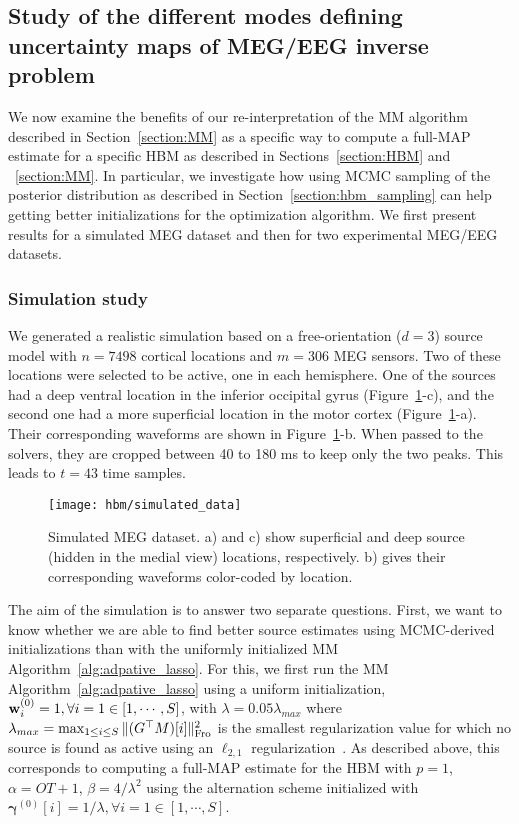 \subsection{Study of the different modes defining uncertainty maps of MEG/EEG inverse problem}

We now examine the benefits of our re-interpretation of the MM algorithm described in Section~\ref{section:MM} as a specific way to compute a full-MAP estimate for a specific HBM as described in Sections~\ref{section:HBM} and ~\ref{section:MM}.
In particular, we investigate how using MCMC sampling of the posterior distribution as described in Section~\ref{section:hbm_sampling} can help getting better initializations for the optimization algorithm.
We first present results for a simulated MEG dataset and then for two experimental MEG/EEG datasets.

\subsubsection{Simulation study}
We generated a realistic simulation based on a free-orientation ($d=3$) source model with $n=7498$ cortical locations and $m=306$ MEG sensors. Two of these locations were selected to be active, one in each hemisphere. One of the sources had a deep ventral location in the inferior occipital gyrus (Figure~\ref{fig:simulated_data}-c), and the second one had a more superficial location in the motor cortex (Figure~\ref{fig:simulated_data}-a). Their corresponding waveforms are shown in Figure~\ref{fig:simulated_data}-b. When passed to the solvers, they are cropped between 40 to 180 ms to keep only the two peaks. This leads to $t=43$ time samples.

\begin{figure}[htp]
	\centering
	\texttt{[image: hbm/simulated\_data]}%

	\caption{Simulated MEG dataset. a) and c) show superficial and deep source (hidden in the medial view) locations, respectively. b) gives their corresponding waveforms color-coded by location.}
	\label{fig:simulated_data}
\end{figure}

The aim of the simulation is to answer two separate questions. First, we want to know whether we are able to find better source estimates using MCMC-derived initializations than with the uniformly initialized MM Algorithm~\ref{alg:adpative_lasso}.
For this, we first run the MM Algorithm~\ref{alg:adpative_lasso} using a uniform initialization, \ie $\mathbf{w}^{(0)}_{i} = 1, \forall i=1\in [1,\cdots,S]$, with $\lambda = 0.05\lambda_{max}$ where $\lambda_{max}= \max_{1 \leq i \leq S} \|{(G^\top M)[i]}\|_{\rm Fro}^2$ is the smallest regularization value for which no source is found as active using an $\ell_{2,1}$ regularization~\cite{Ndiaye_Fercoq_Gramfort_Salmon15,strohmeier-etal:16}. As described above, this corresponds to computing a full-MAP estimate for the HBM with $p=1$, $\alpha = OT +1 $, $\beta = 4/\lambda^2$ using the alternation scheme \label{eq:AO-nu0-X} initialized with $\mathbf{\gamma}^{(0)}[i] = 1/\lambda, \forall i=1\in [1, \cdots, S]$.

